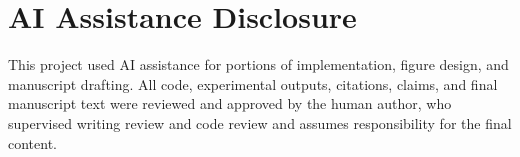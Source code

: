 \section{AI Assistance Disclosure}
\label{sec:ai-assistance}

This project used AI assistance for portions of implementation, figure design,
and manuscript drafting. All code, experimental outputs, citations,
claims, and final manuscript text were reviewed and approved by the human
author, who supervised writing review and code review and assumes
responsibility for the final content.
